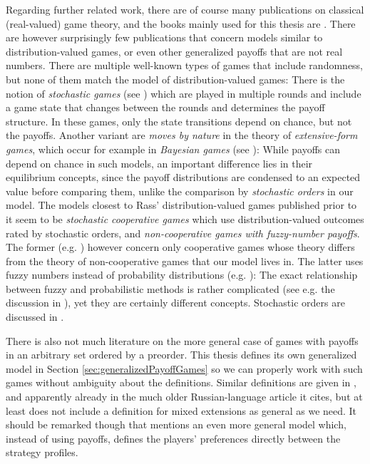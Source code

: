 \documentclass[a4paper,DIV=11,abstracton,twoside=semi]{scrreprt}
\theoremstyle{definition}
\begin{document}
    Regarding further related work, there are of course many publications on classical (real-valued) game theory, and the books mainly used for this thesis are \cites{bib:fudenbergGameTheory,bib:nisanAlgorithmicGameTheory,bib:matsumotoGameTheory}.
    There are however surprisingly few publications that concern models similar to distribution-valued games, or even other generalized payoffs that are not real numbers. There are multiple well-known types of games that include randomness, but none of them match the model of distribution-valued games: 
    There is the notion of \emph{stochastic games} (see \cite{bib:shapleyStochasticGames}) which are played in multiple rounds and include a game state that changes between the rounds and determines the payoff structure. In these games, only the state transitions depend on chance, but not the payoffs. 
    Another variant are \emph{moves by nature} in the theory of \emph{extensive-form games}, which occur for example in \emph{Bayesian games} (see \cite[Chapter 6 and Section 8.3]{bib:fudenbergGameTheory}): While payoffs can depend on chance in such models, an important difference lies in their equilibrium concepts, since the payoff distributions are condensed to an expected value before comparing them, unlike the comparison by \emph{stochastic orders} in our model. 
    The models closest to Rass' distribution-valued games published prior to it seem to be \emph{stochastic cooperative games} which use distribution-valued outcomes rated by stochastic orders, and \emph{non-cooperative games with fuzzy-number payoffs}. 
    The former (e.g. \cite{bib:suijsCooperativeGamesWithStochasticPayoffs,bib:fernandezCoresOfStochasticCoopGamesWithStochasticOrders}) however concern only cooperative games whose theory differs from the theory of non-cooperative games that our model lives in. 
    The latter uses fuzzy numbers instead of probability distributions (e.g. \cite{bib:maedaCharacterizationOfEquilibriumFuzzyPayoff, bib:cevikelSolutionsFuzzyMatrixGames}): The exact relationship between fuzzy and probabilistic methods is rather complicated (see e.g. the discussion in \cite{bib:kandelDistinctionBetweenFuzzyAndStatisticalMethods}), yet they are certainly different concepts.
    Stochastic orders are discussed in \cite{bib:shakedStochasticOrders}.
    
    There is also not much literature on the more general case of games with payoffs in an arbitrary set ordered by a preorder.
    This thesis defines its own generalized model in Section \ref{sec:generalizedPayoffGames} so we can properly work with such games without ambiguity about the definitions. Similar definitions are given in \cite{bib:rozenEquilibriaInGamesWithOrderedOutcomes}, and apparently already in the much older Russian-language article \cite{bib:vorobevThePresentStateOfGameTheory} it cites, but at least \cite{bib:rozenEquilibriaInGamesWithOrderedOutcomes} does not include a definition for mixed extensions as general as we need.
    It should be remarked though that \cite[Section 1.2.1]{bib:nisanAlgorithmicGameTheoryCh1Basic} mentions an even more general model which, instead of using payoffs, defines the players' preferences directly between the strategy profiles.
    
\end{document}
